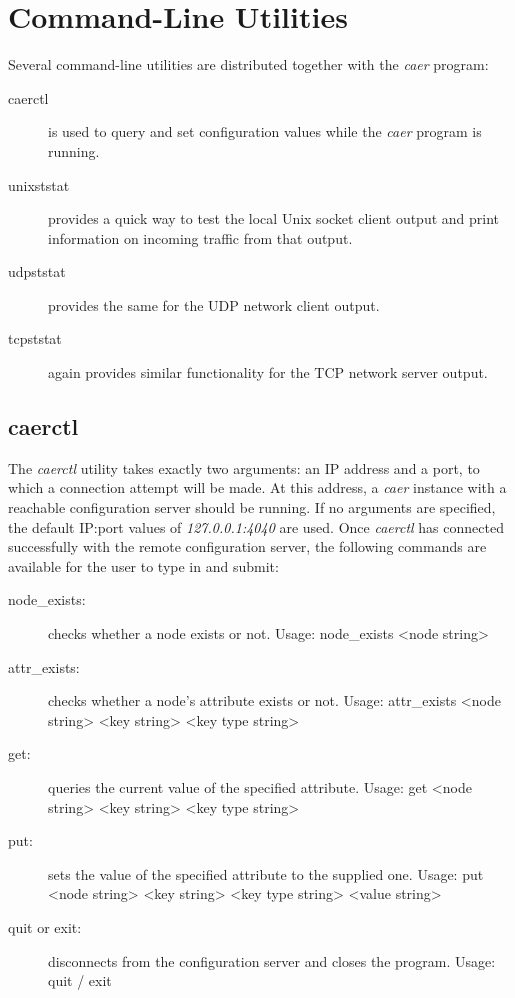 \documentclass[a4paper,12pt]{report}
\begin{document}
\section{Command-Line Utilities} \label{sec:cli_utilities}

Several command-line utilities are distributed together with the \emph{caer} program:
\begin{description}
\item[caerctl] is used to query and set configuration values while the \emph{caer} program is running.
\item[unixststat] provides a quick way to test the local Unix socket client output and print information on incoming traffic from that output.
\item[udpststat] provides the same for the UDP network client output.
\item[tcpststat] again provides similar functionality for the TCP network server output.
\end{description}

\subsection{caerctl} \label{subsec:caerctl}

The \emph{caerctl} utility takes exactly two arguments: an IP address and a port, to which a connection attempt will be made. At this address, a \emph{caer} instance with a reachable configuration server should be running.
If no arguments are specified, the default IP:port values of \emph{127.0.0.1:4040} are used.
Once \emph{caerctl} has connected successfully with the remote configuration server, the following commands are available for the user to type in and submit:
\begin{description}
\item[node\_exists:] checks whether a node exists or not.
\subitem Usage: node\_exists <node string>
\item[attr\_exists:] checks whether a node's attribute exists or not.
\subitem Usage: attr\_exists <node string> <key string> <key type string>
\item[get:] queries the current value of the specified attribute.
\subitem Usage: get <node string> <key string> <key type string>
\item[put:] sets the value of the specified attribute to the supplied one.
\subitem Usage: put <node string> <key string> <key type string> <value string>
\item[quit or exit:] disconnects from the configuration server and closes the program.
\subitem Usage: quit / exit
\end{description}
\end{document}
